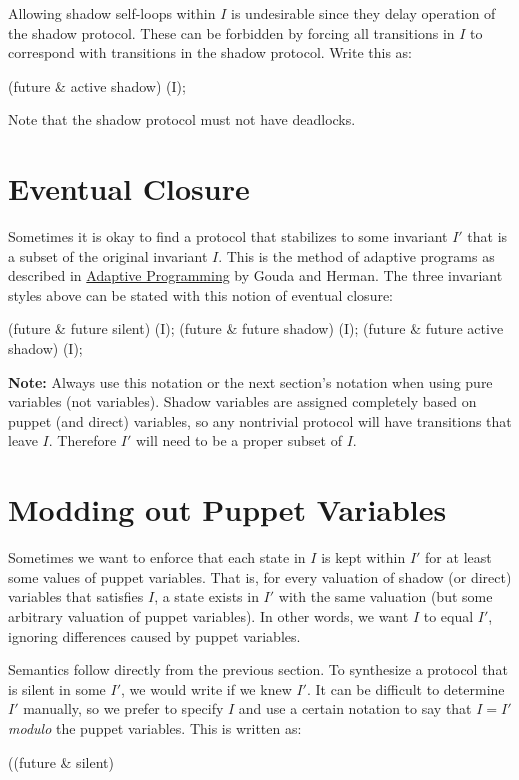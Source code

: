 Allowing shadow self-loops within $I$ is undesirable since they delay operation of the shadow protocol.
These can be forbidden by forcing all transitions in $I$ to correspond with transitions in the shadow protocol.
Write this as:
\begin{code}
(future & active shadow) (I);
\end{code}
Note that the shadow protocol must not have deadlocks.


\section{Eventual Closure}

Sometimes it is okay to find a protocol that stabilizes to some invariant $I'$ that is a subset of the original invariant $I$.
This is the method of adaptive programs as described in \href{http://dx.doi.org/10.1109/32.92911}{Adaptive Programming} by Gouda and Herman.
The three invariant styles above can be stated with this notion of eventual closure:
\begin{code}
(future & future silent) (I);
(future & future shadow) (I);
(future & future active shadow) (I);
\end{code}

\textbf{Note:} Always use this notation or the next section's notation when using pure  variables (not  variables).
Shadow variables are assigned completely based on puppet (and direct) variables, so any nontrivial protocol will have transitions that leave $I$.
Therefore $I'$ will need to be a proper subset of $I$.


\section{Modding out Puppet Variables}

Sometimes we want to enforce that each state in $I$ is kept within $I'$ for at least some values of puppet variables.
That is, for every valuation of shadow (or direct) variables that satisfies $I$, a state exists in $I'$ with the same valuation (but some arbitrary valuation of puppet variables).
In other words, we want $I$ to equal $I'$, ignoring differences caused by puppet variables.

Semantics follow directly from the previous section.
To synthesize a protocol that is silent in some $I'$, we would write  if we knew $I'$.
It can be difficult to determine $I'$ manually, so we prefer to specify $I$ and use a certain notation to say that $I=I'$ \textit{modulo} the puppet variables.
This is written as:
\begin{code}
((future & silent) %
\end{code}

